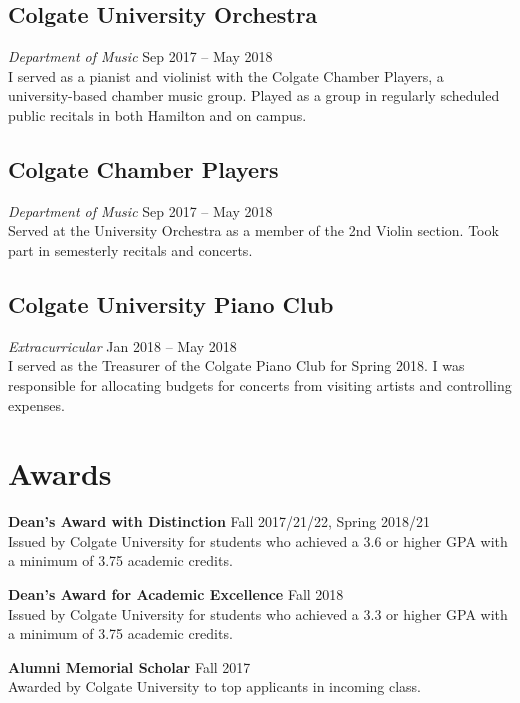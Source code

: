 \documentclass[11pt, letterpaper]{article}
\begin{document}
\subsection{Colgate University Orchestra} 
\noindent \emph{Department of Music} \hfill Sep 2017 – May 2018\\
\noindent I served as a pianist and violinist with the Colgate Chamber Players, a university-based chamber music group. Played as a group in regularly scheduled public recitals in both Hamilton and on campus.

\subsection{Colgate Chamber Players} 
\noindent \emph{Department of Music} \hfill Sep 2017 – May 2018\\
\noindent Served at the University Orchestra as a member of the 2nd Violin section. Took part in semesterly recitals and concerts.

\subsection{Colgate University Piano Club} 
\noindent \emph{Extracurricular} \hfill Jan 2018 – May 2018\\
I served as the Treasurer of the Colgate Piano Club for Spring 2018. I was responsible for allocating budgets for concerts from visiting artists and controlling expenses.
\section{Awards}
\noindent\textbf{Dean's Award with Distinction} \hfill Fall 2017/21/22, Spring 2018/21\\
Issued by Colgate University for students who achieved a 3.6 or higher GPA with a minimum of 3.75 academic credits.

\noindent\textbf{Dean's Award for Academic Excellence} \hfill Fall 2018\\
Issued by Colgate University for students who achieved a 3.3 or higher GPA with a minimum of 3.75 academic credits.

\noindent\textbf{Alumni Memorial Scholar} \hfill Fall 2017\\
Awarded by Colgate University to top applicants in incoming class.
\end{document}
